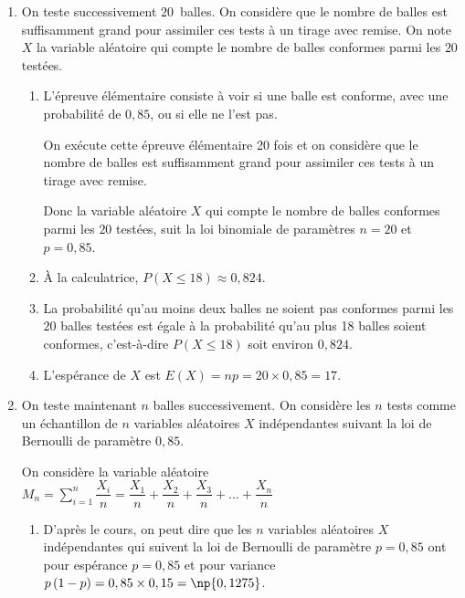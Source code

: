 \begin{enumerate}
\item On teste successivement $20$~balles. On considère que le nombre de balles est suffisamment grand pour assimiler ces tests à un tirage avec remise. On note $X$ la variable aléatoire qui compte le nombre de balles conformes parmi les $20$ testées.
	\begin{enumerate}
		\item 
L'épreuve élémentaire consiste à voir si une balle est conforme, avec une probabilité de $0,85$, ou si elle ne l'est pas.

On exécute cette épreuve élémentaire 20 fois et on  considère que le nombre de balles est suffisamment grand pour assimiler ces tests à un tirage avec remise.

Donc la variable aléatoire $X$ qui compte le nombre de balles conformes parmi les $20$ testées, suit la loi binomiale de paramètres $n=20$ et $p=0,85$.
		
		\item À la calculatrice,  $P\left (X \leqslant 18\right ) \approx 0,824$.
		
		\item La probabilité qu'au moins deux balles ne soient pas conformes parmi les $20$ balles testées est  égale à la probabilité qu'au plus 18 balles soient conformes, c'est-à-dire $P\left (X\leqslant18\right )$ soit environ $0,824$.
		
		
		\item L'espérance de $X$ est $E(X)=np=20\times 0,85=17$.
	\end{enumerate}
	
\item On teste maintenant $n$ balles successivement. On considère les $n$ tests comme un échantillon de $n$ variables aléatoires $X$ indépendantes suivant la loi de Bernoulli de paramètre $0,85$.
	
On considère la variable aléatoire
	$M_n = \displaystyle\sum_{i=1}^n \dfrac{X_i}{n} = \dfrac{X_1}{n} + \dfrac{X_2}{n} + \dfrac{X_3}{n} + \ldots + \dfrac{X_n}{n}$

	\begin{enumerate}
		\item 
D'après le cours, on peut dire que les  $n$ variables aléatoires $X$ indépendantes qui suivent la loi de Bernoulli de paramètre $p=0,85$ ont pour espérance $p=0,85$ et pour variance $p\left (1-p\right )=0,85\times 0,15=\np{0,1275}$.

\end{enumerate}
\end{enumerate}
